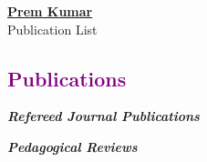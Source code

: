 \documentclass[a4paper,11pt]{article}
\newcommand{\sectionheading}[1]{\subsection*{\textcolor{purple}{#1}}}
\begin{document}
\begin{center}
    \LARGE{\href{https://scholar.google.com/citations?hl=en&user=f-ZPkk0AAAAJ}{\textbf{Prem Kumar}}} \\[0.2cm]
    \large{Publication List}
\end{center}

\sectionheading{Publications}

\nocite{*}

\textbf{\textit{Refereed Journal Publications}}
\printbibliography[heading=none,keyword=refereed]

\textbf{\textit{Pedagogical Reviews}}
\printbibliography[heading=none,keyword=pedagogical]
\end{document}
